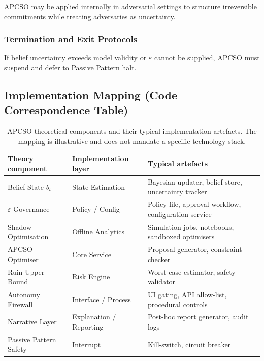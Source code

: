 APCSO may be applied internally in adversarial settings to structure
irreversible commitments while treating adversaries as uncertainty.

\subsubsection{Termination and Exit Protocols}

If belief uncertainty exceeds model validity or $\varepsilon$ cannot
be supplied, APCSO must suspend and defer to Passive Pattern halt.

\subsection{Implementation Mapping (Code Correspondence Table)}

\begin{table}[ht]
\centering
\small
\begin{tabularx}{\linewidth}{lXX}
\toprule
\textbf{Theory component} & \textbf{Implementation layer} & \textbf{Typical artefacts} \\
\midrule
Belief State $b_t$
& State Estimation
& Bayesian updater, belief store, uncertainty tracker \\

$\varepsilon$-Governance
& Policy / Config
& Policy file, approval workflow, configuration service \\

Shadow Optimisation
& Offline Analytics
& Simulation jobs, notebooks, sandboxed optimisers \\

APCSO Optimiser
& Core Service
& Proposal generator, constraint checker \\

Ruin Upper Bound
& Risk Engine
& Worst-case estimator, safety validator \\

Autonomy Firewall
& Interface / Process
& UI gating, API allow-list, procedural controls \\

Narrative Layer
& Explanation / Reporting
& Post-hoc report generator, audit logs \\

Passive Pattern Safety
& Interrupt
& Kill-switch, circuit breaker \\

\bottomrule
\end{tabularx}
\caption[APCSO implementation mapping]{APCSO theoretical components
and their typical implementation artefacts. The mapping is
illustrative and does not mandate a specific technology stack.}
\label{tab:apcso-implementation}
\end{table}

